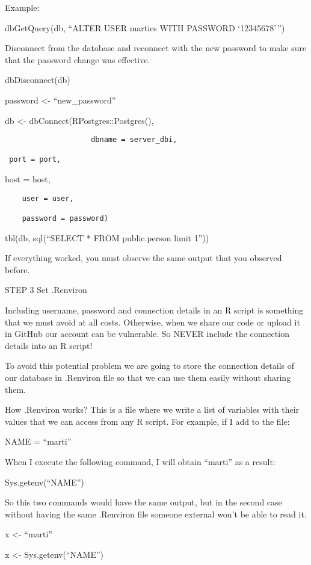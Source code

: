 \documentclass[
  letterpaper,
  DIV=11,
  numbers=noendperiod]{scrreprt}
\begin{document}
Example:

dbGetQuery(db, ``ALTER USER martics WITH PASSWORD `12345678'\,'')

Disconnect from the database and reconnect with the new password to make
sure that the password change was effective.

dbDisconnect(db)

password \textless- ``new\_password''

db \textless- dbConnect(RPostgres::Postgres(),

\begin{verbatim}
                    dbname = server_dbi, 

 port = port, 
\end{verbatim}

host = host,

\begin{verbatim}
    user = user,

    password = password) 
\end{verbatim}

tbl(db, sql(``SELECT * FROM public.person limit 1''))

If everything worked, you must observe the same output that you observed
before.

STEP 3 Set .Renviron

Including username, password and connection details in an R script is
something that we must avoid at all costs. Otherwise, when we share our
code or upload it in GitHub our account can be vulnerable. So NEVER
include the connection details into an R script!

To avoid this potential problem we are going to store the connection
details of our database in .Renviron file so that we can use them easily
without sharing them.

How .Renviron works? This is a file where we write a list of variables
with their values that we can access from any R script. For example, if
I add to the file:

NAME = ``marti''

When I execute the following command, I will obtain ``marti'' as a
result:

Sys.getenv(``NAME'')

So this two commands would have the same output, but in the second case
without having the same .Renviron file someone external won't be able to
read it.

x \textless- ``marti''

x \textless- Sys.getenv(``NAME'')
\end{document}
